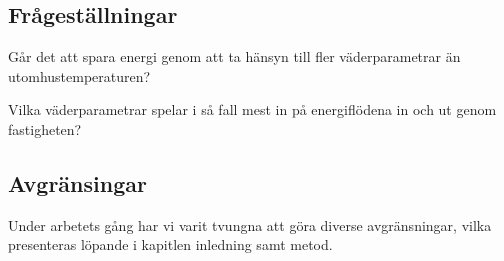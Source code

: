 \subsection{Frågeställningar}
Går det att spara energi genom att ta hänsyn till fler väderparametrar än utomhustemperaturen?

Vilka väderparametrar spelar i så fall mest in på energiflödena in och ut genom fastigheten?

\subsection{Avgränsingar}
Under arbetets gång har vi varit tvungna att göra diverse avgränsningar, vilka presenteras löpande i kapitlen inledning samt metod.

